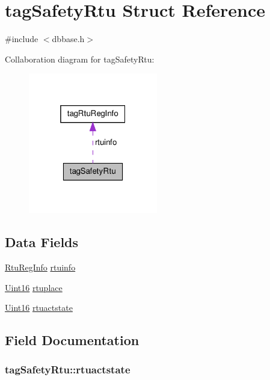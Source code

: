 \hypertarget{structtagSafetyRtu}{\section{tag\-Safety\-Rtu Struct Reference}
\label{structtagSafetyRtu}
}


{\ttfamily \#include $<$dbbase.\-h$>$}



Collaboration diagram for tag\-Safety\-Rtu\-:\nopagebreak
\begin{figure}[H]
\begin{center}
\leavevmode
\includegraphics[width=160pt]{structtagSafetyRtu__coll__graph}
\end{center}
\end{figure}
\subsection*{Data Fields}
\begin{DoxyCompactItemize}
\item 
\hyperlink{dbbase_8h_a4f06859d090e81c1be0c142757ce6e11}{Rtu\-Reg\-Info} \hyperlink{structtagSafetyRtu_aad00f636b3c245ad895894fd41ad56dc}{rtuinfo}
\item 
\hyperlink{base_8h_ae9f2e1f80fbd243687a04febbf590e13}{Uint16} \hyperlink{structtagSafetyRtu_a9248c682eaf6771ebbbcf0a8501084d7}{rtuplace}
\item 
\hyperlink{base_8h_ae9f2e1f80fbd243687a04febbf590e13}{Uint16} \hyperlink{structtagSafetyRtu_ad880f3ae6e24107b4ab17ad3d7ccdf72}{rtuactstate}
\end{DoxyCompactItemize}


\subsection{Field Documentation}
\hypertarget{structtagSafetyRtu_ad880f3ae6e24107b4ab17ad3d7ccdf72}{
\subsubsection[{rtuactstate}]{ tag\-Safety\-Rtu\-::rtuactstate}}\label{structtagSafetyRtu_ad880f3ae6e24107b4ab17ad3d7ccdf72}


